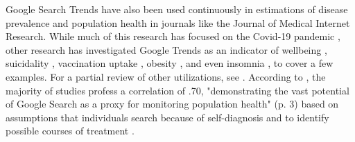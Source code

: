 Google Search Trends have also been used continuously in estimations of
disease prevalence and population health in journals like the Journal of
Medical Internet Research. While much of this research has focused on
the Covid-19 pandemic \citep{jimenez_etal20,jimenezCOVID19SymptomGoogle2020,limEstimatingInformationSeekingBehaviour2020,mavraganiCOVID19PredictabilityUnited2020,nguyenGoogleTrendsAnalysis2020, todorovaInternetBasedData2021} , other
research has investigated Google Trends as an indicator of wellbeing
\citep{brodeurCOVID19LockdownsWellbeing2021,carpiTwitterSubjectiveWellBeing2020, duCOVID19IncreasesOnline2020},
suicidality \citep{burnettTimeTrendsPublic2020}, vaccination uptake
\citep{dalumhansenEnsembleLearnedVaccination2016}, obesity
\citep{sarigulNowcastingObesityUsing2014}, and even insomnia
\citep{zittingGoogleTrendsReveal2020}, to cover a few examples. For a partial
review of other utilizations, see \citet{nutiUseGoogleTrends2014}. According to
\citet{jaidkaInformationseekingVsSharing2021}, the majority of studies profess
a correlation of \> .70, "demonstrating the vast potential of Google
Search as a proxy for monitoring population health" (p. 3) based on
assumptions that individuals search because of self-diagnosis and to
identify possible courses of treatment
\citep{dechoudhurySeekingSharingHealth2014}.







